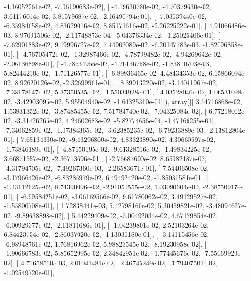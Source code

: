\documentclass{article}
\begin{document}
         -4.16052261e-02,  -7.06190683e-02],
       [ -4.19630780e-02,  -4.70379630e-02,   3.61176014e-02,
          3.81579687e-02,  -2.16490794e-01],
       [ -7.03639440e-02,  -6.35984658e-02,   4.83629016e-02,
          8.85171616e-02,  -2.26225222e-01],
       [  4.91066486e-03,   8.97691506e-02,  -2.11748873e-04,
         -5.04376334e-02,  -1.25025406e-01],
       [ -7.62901883e-02,   9.19996727e-02,   7.44903089e-02,
         -6.20147783e-03,  -1.82096858e-01],
       [ -4.76705472e-02,  -1.32987466e-02,  -4.78799482e-02,
         -4.94269642e-02,  -2.06136898e-01],
       [ -4.78534956e-02,  -4.26136758e-02,  -1.83810703e-03,
          5.82444210e-02,  -1.71126577e-01],
       [ -6.89936465e-02,   4.48434353e-02,   6.15866094e-02,
          8.92620126e-02,  -2.32699961e-01],
       [  8.39913220e-02,  -3.14041967e-02,  -7.38178047e-02,
          5.37350535e-02,  -1.55034928e-01],
       [  4.03528046e-02,   1.06531098e-02,  -3.42903095e-02,
          5.95504940e-02,  -1.64325310e-01]]), array([[  3.14716868e-02,   1.53831352e-02,  -3.87485455e-02,
          7.51784740e-02,  -7.04325084e-02],
       [  6.77218012e-02,  -3.31426265e-02,   4.24602683e-02,
         -5.82774656e-04,  -1.47166255e-01],
       [ -7.34062859e-02,  -1.07384365e-02,  -3.62385235e-02,
         -6.79233889e-03,  -2.13812804e-01],
       [  7.65134330e-02,  -9.43296800e-02,   4.83323890e-02,
          4.30660597e-02,  -1.73846189e-01],
       [ -4.87150195e-02,  -9.61328516e-02,  -1.49834225e-02,
          3.66871557e-02,  -2.36713696e-01],
       [ -2.76687690e-02,   8.65982187e-03,  -4.31794705e-02,
         -7.49267360e-03,  -2.26583671e-01],
       [  7.54406508e-02,  -3.17966426e-02,  -6.83285979e-02,
          6.49492420e-02,  -1.85031581e-01],
       [ -1.43112625e-02,   8.74390096e-02,  -2.91050555e-02,
          1.03090604e-02,  -2.38750917e-01],
       [ -6.99584251e-02,  -3.06169566e-02,   9.61780062e-02,
          3.49129527e-02,  -1.55800708e-01],
       [  1.72838441e-03,   5.42798160e-02,   5.30459821e-02,
         -3.48094627e-02,  -9.89638898e-02],
       [  5.44229409e-02,  -3.00492034e-02,   4.67179854e-02,
         -6.00929377e-02,  -2.11811686e-01],
       [ -1.04239801e-02,   2.52103264e-02,   6.84423754e-02,
         -2.86037020e-02,  -1.13036180e-01],
       [ -3.14115456e-02,  -6.98948761e-02,   1.76816962e-02,
          5.98823545e-02,  -8.19230958e-02],
       [ -1.90666783e-02,   5.85652995e-02,   2.34842951e-02,
         -1.77445676e-02,  -7.55069920e-02],
       [  4.71658560e-03,   2.01041481e-02,  -2.46745249e-02,
         -3.79407501e-02,  -1.02549720e-01],
\end{document}
